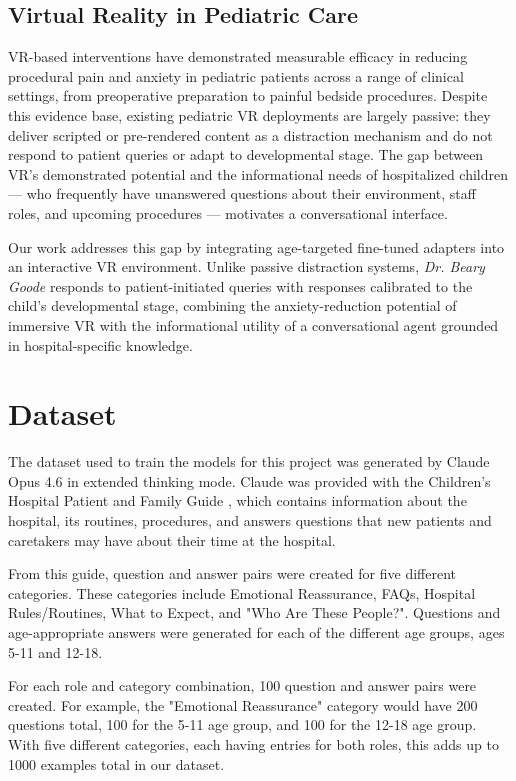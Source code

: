 \documentclass[journal]{IEEEtai}
\begin{document}
\subsection{Virtual Reality in Pediatric Care}

VR-based interventions have demonstrated measurable efficacy in reducing procedural pain and anxiety in pediatric patients across a range of clinical settings, from preoperative preparation to painful bedside procedures. Despite this evidence base, existing pediatric VR deployments are largely passive: they deliver scripted or pre-rendered content as a distraction mechanism and do not respond to patient queries or adapt to developmental stage. The gap between VR's demonstrated potential and the informational needs of hospitalized children --- who frequently have unanswered questions about their environment, staff roles, and upcoming procedures --- motivates a conversational interface.

Our work addresses this gap by integrating age-targeted fine-tuned adapters into an interactive VR environment. Unlike passive distraction systems, \textit{Dr. Beary Goode} responds to patient-initiated queries with responses calibrated to the child's developmental stage, combining the anxiety-reduction potential of immersive VR with the informational utility of a conversational agent grounded in hospital-specific knowledge.

\section{Dataset}
The dataset used to train the models for this project was generated by Claude Opus 4.6 in extended thinking mode. Claude was provided with the Children's Hospital Patient and Family Guide \cite{hospitalguide}, which contains information about the hospital, its routines, procedures, and answers questions that new patients and caretakers may have about their time at the hospital.

From this guide, question and answer pairs were created for five different categories. These categories include Emotional Reassurance, FAQs, Hospital Rules/Routines, What to Expect, and "Who Are These People?". Questions and age-appropriate answers were generated for each of the different age groups, ages 5-11 and 12-18.

For each role and category combination, 100 question and answer pairs were created. For example, the "Emotional Reassurance" category would have 200 questions total, 100 for the 5-11 age group, and 100 for the 12-18 age group. With five different categories, each having entries for both roles, this adds up to 1000 examples total in our dataset.
\end{document}
